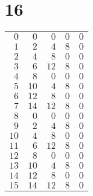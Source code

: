 \documentclass[a4paper]{scrartcl}
\begin{document}
\section*{16}
\begin{tabular}{rrrrr}
\toprule
$0$ & $0$ & $0$ & $0$ & $0$ \\
$1$ & $2$ & $4$ & $8$ & $0$ \\
$2$ & $4$ & $8$ & $0$ & $0$ \\
$3$ & $6$ & $12$ & $8$ & $0$ \\
$4$ & $8$ & $0$ & $0$ & $0$ \\
$5$ & $10$ & $4$ & $8$ & $0$ \\
$6$ & $12$ & $8$ & $0$ & $0$ \\
$7$ & $14$ & $12$ & $8$ & $0$ \\
$8$ & $0$ & $0$ & $0$ & $0$ \\
$9$ & $2$ & $4$ & $8$ & $0$ \\
$10$ & $4$ & $8$ & $0$ & $0$ \\
$11$ & $6$ & $12$ & $8$ & $0$ \\
$12$ & $8$ & $0$ & $0$ & $0$ \\
$13$ & $10$ & $4$ & $8$ & $0$ \\
$14$ & $12$ & $8$ & $0$ & $0$ \\
$15$ & $14$ & $12$ & $8$ & $0$ \\
\bottomrule
\end{tabular}
\end{document}
